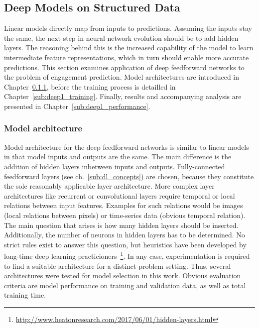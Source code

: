 \subsection{Deep Models on Structured Data}
\label{sec:deep1}

Linear models directly map from inputs to predictions.
Assuming the inputs stay the same, the next step in neural network evolution
should be to add hidden layers.
The reasoning behind this is the increased capability of the model to learn intermediate
feature representations, which in turn should enable more accurate predictions.
This section examines application of deep feedforward networks to the problem
of engagement prediction.
Model architectures are introduced in Chapter~\ref{sub:deep1_architecture}, 
before the training process is detailled in Chapter~\ref{sub:deep1_training}.
Finally, results and accompanying analysis are presented in Chapter~\ref{sub:deep1_performance}.

\subsubsection{Model architecture}
\label{sub:deep1_architecture}

Model architecture for the deep feedforward networks is similar to linear models
in that model inputs and outputs are the same.
The main difference is the addition of hidden layers inbetween inputs and outputs.
Fully-connected feedforward layers (see ch.~\ref{sub:dl_concepts}) are chosen,
because they constitute the sole reasonably applicable layer architecture.
More complex layer architectures like recurrent or convolutional layers require
temporal or local relations between input features.
Examples for such relations would be images (local relations between pixels)
or time-series data (obvious temporal relation).
The main question that arises is how many hidden layers should be inserted.
Additionally, the number of neurons in hidden layers has to be determined.
No strict rules exist to answer this question, but heuristics have been developed
by long-time deep learning practicioners~\footnote{\url{http://www.heatonresearch.com/2017/06/01/hidden-layers.html}}.
In any case, experimentation is required to find a suitable architecture for a distinct problem setting.
Thus, several architectures were tested for model selection in this work.
Obvious evaluation criteria are model performance on training and validation data,
as well as total training time.

